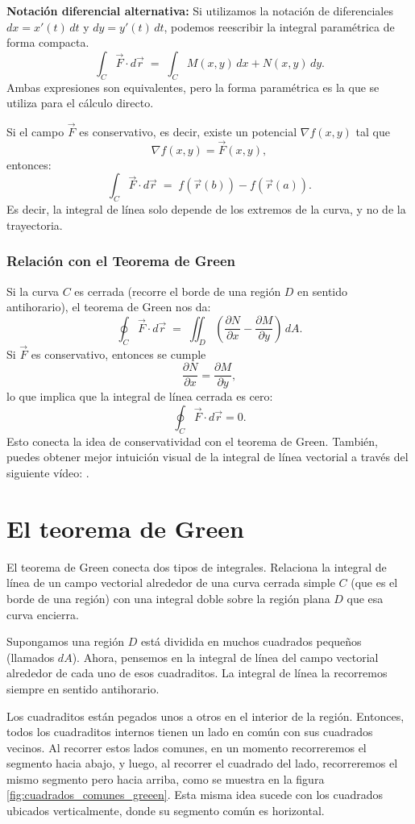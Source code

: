 \textbf{Notación diferencial alternativa:}
Si utilizamos la notación de diferenciales $dx = x'(t)\,dt$ y $dy = y'(t)\,dt$, podemos reescribir la integral paramétrica de forma compacta. 
$$
\int_C \vec{F}\cdot d\vec{r} \;=\; \int_C M(x,y)\,dx + N(x,y)\,dy.
$$
Ambas expresiones son equivalentes, pero la forma paramétrica es la que se utiliza para el cálculo directo.

Si el campo $\vec{F}$ es conservativo, es decir, existe un potencial $\nabla f(x,y)$ tal que
$$
\nabla f(x,y) = \vec{F}(x,y),
$$
entonces:
$$
\int_C \vec{F}\cdot d\vec{r} \;=\; f(\vec{r}(b)) - f(\vec{r}(a)).
$$
Es decir, la integral de línea solo depende de los extremos de la curva, y no de la trayectoria.

\subsubsection{Relación con el Teorema de Green}

Si la curva $C$ es cerrada (recorre el borde de una región $D$ en sentido antihorario), el teorema de Green nos da:
$$
\oint_C \vec{F}\cdot d\vec{r} \;=\; \iint_D \left( \frac{\partial N}{\partial x} - \frac{\partial M}{\partial y} \right)\, dA.
$$
Si $\vec{F}$ es conservativo, entonces se cumple
$$
\frac{\partial N}{\partial x} = \frac{\partial M}{\partial y},
$$
lo que implica que la integral de línea cerrada es cero:
$$
\oint_C \vec{F}\cdot d\vec{r} = 0.
$$
Esto conecta la idea de conservatividad con el teorema de Green. También, puedes obtener mejor intuición visual de la integral de línea vectorial a través del siguiente vídeo: \parencite{vector_line_integral}.

\section{El teorema de Green}

El teorema de Green conecta dos tipos de integrales. Relaciona la integral de línea de un campo vectorial alrededor de una curva cerrada simple $C$ (que es el borde de una región) con una integral doble sobre la región plana $D$ que esa curva encierra.

Supongamos una región $D$ está dividida en muchos cuadrados pequeños (llamados $dA$). Ahora, pensemos en la integral de línea del campo vectorial alrededor de cada uno de esos cuadraditos. La integral de línea la recorremos siempre en sentido antihorario.

Los cuadraditos están pegados unos a otros en el interior de la región. Entonces, todos los cuadraditos internos tienen un lado en común con sus cuadrados vecinos. Al recorrer estos lados comunes, en un momento recorreremos el segmento hacia abajo, y luego, al recorrer el cuadrado del lado, recorreremos el mismo segmento pero hacia arriba, como se muestra en la figura \ref{fig:cuadrados_comunes_greeen}. Esta misma idea sucede con los cuadrados ubicados verticalmente, donde su segmento común es horizontal.

